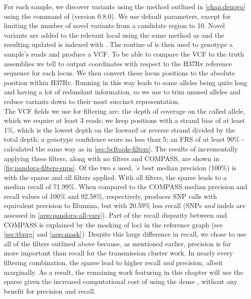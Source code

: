 For each sample, we discover \denovo{} variants using the method outlined in \autoref{chap:denovo} using the  command of \pandora{} (version 0.8.0). We use default parameters, except for limiting the number of novel variants from a candidate region to 10. Novel variants are added to the relevant local \prg{} using the same method as  and the resulting updated \prg{} is indexed with \pandora{}. The  routine of \pandora{} is then used to genotype a sample's reads and produce a VCF. To be able to compare the \pandora{} VCF to the truth assemblies we tell \pandora{} to output coordinates with respect to the H37Rv reference sequence for each locus. We then convert these locus positions to the absolute position within H37Rv. Running \pandora{} in this way leads to some alleles being quite long and having a lot of redundant information, so we use  to trim unused alleles and reduce variants down to their most succinct representation. \\
The \pandora{} VCF fields we use for filtering are: the depth of coverage on the called allele, which we require at least 3 reads; we keep positions with a strand bias of at least 1\%, which is the lowest depth on the forward or reverse strand divided by the total depth; a genotype confidence score no less than 5; an FRS of at least 90\%  - calculated the same way as in \autoref{sec:bcftools-filters}.
The results of incrementally applying these filters, along with no filters and COMPASS, are shown in \autoref{fig:pandora-filters-snps}. Of the two \prg{}s used, \pandora{}'s best median precision (100\%) is with the sparse \prg{} and all filters applied. With all filters, the sparse \prg{} leads to a median recall of 71.99\%. When compared to the COMPASS median precision and recall values of 100\% and 92.58\%, respectively, \pandora{} produces \ont{} SNP calls with equivalent precision to Illumina, but with 20.59\% less recall (SNPs \emph{and} indels are assessed in \autoref{app:pandora-all-vars}). Part of the recall disparity between \pandora{} and COMPASS is explained by the masking of loci in the reference graph (see \autoref{sec:tbprg} and \autoref{app:mask}). Despite this large difference in recall, we chose to use all of the filters outlined above because, as mentioned earlier, precision is far more important than recall for the transmission cluster work.
In nearly every filtering combination, the sparse \prg{} lead to higher recall \emph{and} precision, albeit marginally. As a result, the remaining work featuring \pandora{} in this chapter will use the sparse \prg{} given the increased computational cost of using the dense \prg{}, without any benefit for precision and recall.

